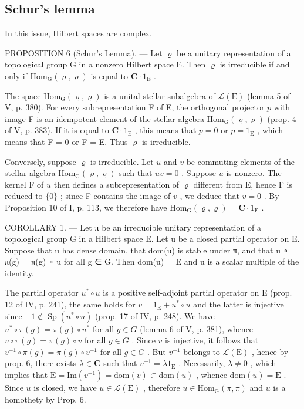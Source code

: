 \subsection{Schur's lemma}

In this issue, Hilbert spaces are complex.

PROPOSITION 6 (Schur's Lemma). --- Let \(\varrho\) be a unitary representation of a topological group G in a nonzero Hilbert space E. Then \(\varrho\) is irreducible if and only if \(\mathrm{Hom}_{\mathrm{G}}(\varrho, \varrho)\) is equal to \(\mathbf{C} \cdot 1_{\mathrm{E}}\) .

The space \(\mathrm{Hom}_{\mathrm{G}}(\varrho, \varrho)\) is a unital stellar subalgebra of \(\mathcal{L}(\mathrm{E})\) (lemma 5 of V, p. 380). For every subrepresentation F of E, the orthogonal projector \(p\) with image F is an idempotent element of the stellar algebra \(\mathrm{Hom}_{\mathrm{G}}(\varrho, \varrho)\) (prop. 4 of V, p. 383). If it is equal to \(\mathbf{C} \cdot 1_{\mathrm{E}}\) , this means that \(p = 0\) or \(p = 1_{\mathrm{E}}\) , which means that F = 0 or F = E. Thus \(\varrho\) is irreducible.

Conversely, suppose \(\varrho\) is irreducible. Let \(u\) and \(v\) be commuting elements of the stellar algebra \(\mathrm{Hom}_{\mathrm{G}}(\varrho, \varrho)\) such that \(uv = 0\) . Suppose \(u\) is nonzero. The kernel F of \(u\) then defines a subrepresentation of \(\varrho\) different from E, hence F is reduced to \(\{0\}\) ; since F contains the image of \(v\) , we deduce that \(v = 0\) . By Proposition 10 of I, p. 113, we therefore have \(\mathrm{Hom}_{\mathrm{G}}(\varrho, \varrho) = \mathbf{C} \cdot 1_{\mathrm{E}}\) .

COROLLARY 1. --- Let π be an irreducible unitary representation of a topological group G in a Hilbert space E. Let u be a closed partial operator on E. Suppose that u has dense domain, that dom(u) is stable under π, and that u ∘ π(g) = π(g) ∘ u for all g ∈ G. Then dom(u) = E and u is a scalar multiple of the identity.

The partial operator \(u^{*} \circ u\) is a positive self-adjoint partial operator on E (prop. 12 of IV, p. 241), the same holds for \(v = 1_{\mathrm{E}} + u^{*} \circ u\) and the latter is injective since \(-1 \notin \operatorname{Sp}(u^{*} \circ u)\) (prop. 17 of IV, p. 248). We have \(u^{*} \circ \pi(g) = \pi(g) \circ u^{*}\) for all \(g \in G\) (lemma 6 of V, p. 381), whence \(v \circ \pi(g) = \pi(g) \circ v\) for all \(g \in G\) . Since \(v\) is injective, it follows that \(v^{-1} \circ \pi(g) = \pi(g) \circ v^{-1}\) for all \(g \in G\) . But \(v^{-1}\) belongs to \(\mathcal{L}(\mathrm{E})\) , hence by prop. 6, there exists \(\lambda \in \mathbf{C}\) such that \(v^{-1} = \lambda 1_{\mathrm{E}}\) . Necessarily, \(\lambda \neq 0\) , which implies that \(\mathrm{E} = \mathrm{Im}(v^{-1}) = \mathrm{dom}(v) \subset \mathrm{dom}(u)\) , whence \(\mathrm{dom}(u) = \mathrm{E}\) . Since \(u\) is closed, we have \(u \in \mathcal{L}(\mathrm{E})\) , therefore \(u \in \mathrm{Hom}_{\mathrm{G}}(\pi, \pi)\) and \(u\) is a homothety by Prop. 6.

